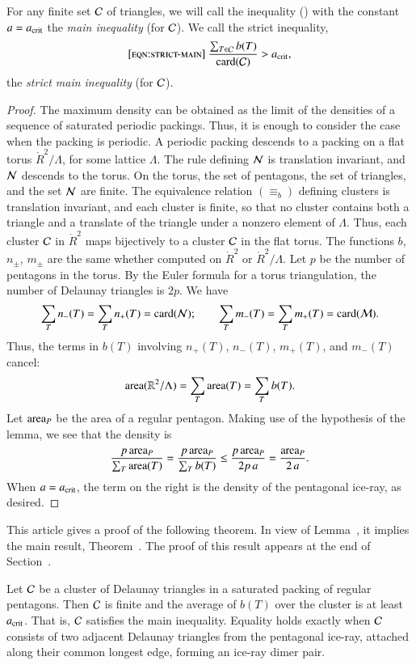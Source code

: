 For any finite set $\mathcal C$ of triangles, we will call the inequality
() with the constant $a=a_\text{crit}$ the {\it main inequality}
(for $\mathcal C$).  We call the strict inequality,
\begin{equation}\libel{eqn:strict-main}
\frac{\sum_{T\in \C} b(T)}{\card(\C)} > \acrit,
\end{equation}
the {\it strict main inequality} (for $\mathcal C$).


\begin{proof} The maximum density can be obtained as the limit of the
  densities of a sequence of saturated periodic packings.  Thus, it is
  enough to consider the case when the packing is periodic.  A
  periodic packing descends to a packing on a flat torus
  $\ring{R}^2/\Lambda$, for some lattice $\Lambda$.  The rule defining
  $\mathcal N$ is translation invariant, and $\mathcal N$ descends to the torus.  On
  the torus, the set of pentagons, the set of triangles, and the set
  $\mathcal N$ are finite.  The equivalence relation $(\equiv_b)$ defining
  clusters is translation invariant, and each cluster is finite, so
  that no cluster contains both a triangle and a translate of the
  triangle under a nonzero element of $\Lambda$.  Thus, each cluster
  $\mathcal C$ in $\ring{R}^2$ maps bijectively to a cluster $\mathcal C$ in the flat
  torus.  The functions $b$, $n_\pm$, $m_\pm$ are the same whether
  computed on $\ring{R}^2$ or $\ring{R}^2/\Lambda$.  Let $p$ be the
  number of pentagons in the torus.  By the Euler formula for a torus
  triangulation, the number of Delaunay triangles is $2p$.  We have
\[
\sum_{T} n_-(T) =  \sum_{T} n_+(T) = {\operatorname{card}}(\mathcal N);\qquad
\sum_{T} m_-(T) =  \sum_{T} m_+(T) = {\operatorname{card}}(\mathcal M).
\]
Thus, the terms in $b(T)$ involving $n_+(T)$, $n_-(T)$, $m_+(T)$,
and $m_-(T)$ cancel:
\[
{\operatorname{area}}(\mathbb{R}^2/\Lambda) = \sum_T {\operatorname{area}}(T) = \sum_T b(T).
\]    
Let ${\operatorname{area}}_P$ be the area of a regular pentagon.  Making use of the
hypothesis of the lemma, we see that the density is
\[
\frac{p\, {\operatorname{area}}_P}{\sum_T {\operatorname{area}}(T)} 
=\frac{p\, {\operatorname{area}}_P}{\sum_T b(T)} \le\frac{p\, {\operatorname{area}}_P}{2 p\, a} 
= \frac{{\operatorname{area}}_P}{2\, a}.
\]
When $a=a_\text{crit}$, the term on the right is the density of the
pentagonal ice-ray, as desired.
\end{proof}

This article gives a proof of the following theorem. In view of
Lemma~, it implies the main result, Theorem~.  The proof of this result appears at the end of
Section~.

\begin{theorem}
  Let $\mathcal C$ be a cluster of Delaunay triangles in a saturated packing
  of regular pentagons.  Then $\mathcal C$ is finite and the average of $b(T)$
  over the cluster is at least $a_\text{crit}$.  That is, $\mathcal C$ satisfies the
  main inequality.  Equality holds exactly when $\mathcal C$ consists of two
  adjacent Delaunay triangles from the pentagonal ice-ray, attached
  along their common longest edge, forming an ice-ray dimer pair.
\end{theorem}

